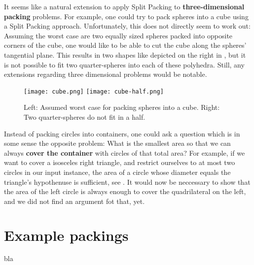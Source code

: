 \documentclass[a4paper,style=print,bibliography=totoc,nexus,lnum,extramargin]{tubsbook}
\begin{document}
It seems like a natural extension to apply Split Packing to \textbf{three-dimensional packing} problems. For example, one could try to pack spheres into a cube using a Split Packing approach. Unfortunately, this does not directly seem to work out: Assuming the worst case are two equally sized spheres packed into opposite corners of the cube, one would like to be able to cut the cube along the spheres' tangential plane. This results in two shapes like depicted on the right in , but it is not possible to fit two quarter-spheres into each of these polyhedra. Still, any extensions regarding three dimensional problems would be notable.

\begin{figure}
    \texttt{[image: cube.png]}
    \texttt{[image: cube-half.png]}
    \caption{Left: Assumed worst case for packing spheres into a cube. Right: Two quarter-spheres do not fit in a half.}\label{fig:cube-half}
\end{figure}

Instead of packing circles into containers, one could ask a question which is in some sense the opposite problem: What is the smallest area so that we can always \textbf{cover the container} with circles of that total area? For example, if we want to cover a isosceles right triangle, and restrict ourselves to at most two circles in our input instance, the area of a circle whose diameter equals the triangle's hypothenuse is sufficient, see . It would now be neccessary to show that the area of the left circle is always enough to cover the quadrilateral on the left, and we did not find an argument fot that, yet.


\appendix

\chapter{Example packings}

bla

\printbibliography
\end{document}
